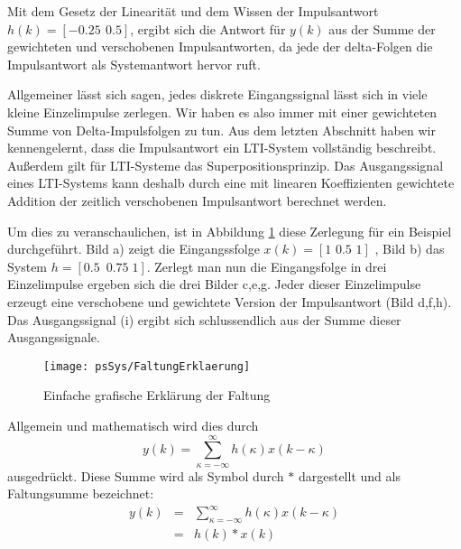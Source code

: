 Mit dem Gesetz der Linearität und dem Wissen der Impulsantwort
$h(k) = [-0.25 \:\, 0.5]$, ergibt sich die Antwort für $y(k)$ aus
der Summe der gewichteten und verschobenen Impulsantworten, da
jede der delta-Folgen die Impulsantwort als Systemantwort hervor
ruft.

Allgemeiner lässt sich sagen, jedes diskrete Eingangssignal lässt
sich in viele kleine Einzelimpulse zerlegen. Wir haben es also
immer mit einer gewichteten Summe von Delta-Impulsfolgen zu tun.
Aus dem letzten Abschnitt haben wir kennengelernt, dass die
Impulsantwort ein LTI-System vollständig beschreibt. Außerdem gilt
für LTI-Systeme das Superpositionsprinzip. Das Ausgangssignal
eines LTI-Systems kann deshalb durch eine mit linearen
Koeffizienten gewichtete Addition der zeitlich verschobenen
Impulsantwort berechnet werden.

Um dies zu veranschaulichen, ist in Abbildung
\ref{pic:Faltungserklaerung} diese Zerlegung für ein Beispiel
durchgeführt. Bild a) zeigt die Eingangssfolge $x(k) = [1\,\, 0.5
\,\, 1]$ , Bild b) das System $h = [0.5 \,\,\,  0.75 \; 1]$.
Zerlegt man nun die Eingangsfolge in drei Einzelimpulse ergeben
sich die drei Bilder c,e,g. Jeder dieser Einzelimpulse erzeugt
eine verschobene und gewichtete Version der Impulsantwort (Bild
d,f,h). Das Ausgangssignal (i) ergibt sich schlussendlich aus der
Summe dieser Ausgangssignale.
\begin{figure}[H]
\begin{center}
\texttt{[image: psSys/FaltungErklaerung]}
\caption{\label{pic:Faltungserklaerung} Einfache grafische
Erklärung der Faltung}
\end{center}
\end{figure}

Allgemein und mathematisch wird dies durch
\begin{equation}
    y(k) = \sum_{\kappa = -\infty}^{\infty} h(\kappa) x(k-\kappa)
\end{equation}
ausgedrückt. Diese Summe wird als Symbol durch $\ast$ dargestellt und als
Faltungsumme bezeichnet:
\begin{eqnarray}
    y(k) &=& \sum_{\kappa = -\infty}^{\infty} h(\kappa) x(k-\kappa)\\
        & = & h(k) \ast x(k)
\end{eqnarray}

